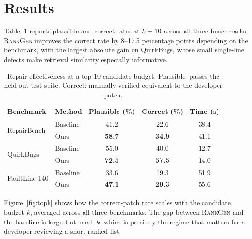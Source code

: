 \section{Results}
\label{sec:results}
Table~\ref{tab:results} reports plausible and correct rates at $k{=}10$ across all three benchmarks. \textsc{RankGen} improves the correct rate by 8--17.5 percentage points depending on the benchmark, with the largest absolute gain on QuirkBugs, whose small single-line defects make retrieval similarity especially informative.

\begin{table}[t]
\centering
\caption{Repair effectiveness at a top-10 candidate budget. Plausible: passes the held-out test suite. Correct: manually verified equivalent to the developer patch.}
\label{tab:results}
\small
\setlength{\tabcolsep}{3.6pt}
\begin{tabular}{@{}llccc@{}}
\toprule
\rowcolor{aseblue!10}
Benchmark & Method & Plausible (\%) & Correct (\%) & Time (s) \\
\midrule
\multirow{2}{*}{RepairBench} & Baseline & 41.2 & 22.6 & 38.4 \\
 & Ours & \textbf{58.7} & \textbf{34.9} & 41.1 \\
\midrule
\multirow{2}{*}{QuirkBugs} & Baseline & 55.0 & 40.0 & 12.7 \\
 & Ours & \textbf{72.5} & \textbf{57.5} & 14.0 \\
\midrule
\multirow{2}{*}{FaultLine-140} & Baseline & 33.6 & 19.3 & 51.9 \\
 & Ours & \textbf{47.1} & \textbf{29.3} & 55.6 \\
\bottomrule
\end{tabular}
\end{table}

Figure~\ref{fig:topk} shows how the correct-patch rate scales with the candidate budget $k$, averaged across all three benchmarks. The gap between \textsc{RankGen} and the baseline is largest at small $k$, which is precisely the regime that matters for a developer reviewing a short ranked list.

